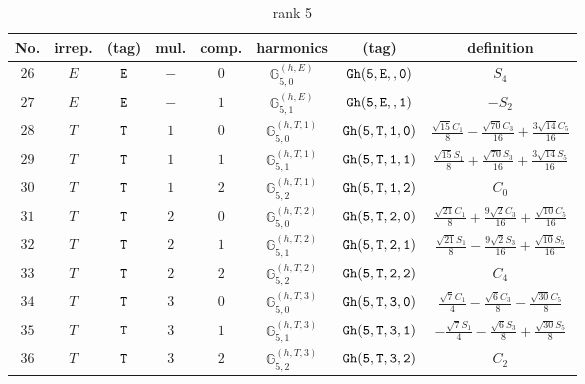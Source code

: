 \documentclass[fleqn,8pt]{jsarticle}
\begin{document}
\begin{table}[ht!]
\begin{center}
\caption{rank 5}
\renewcommand{\arraystretch}{1.3}
\begin{tabular}{cccccccc} \hline \hline
No. & irrep. & (tag) & mul. & comp. & harmonics & (tag) & definition \\ \hline
$ 26 $ & $ E $ & $ {\tt E} $ & $ - $ & $ 0 $ & $ \mathbb{G}_{5,0}^{(h,E)} $ & $ {\tt Gh(5,E,,0)} $ & $ S_{4} $ \\
$ 27 $ & $ E $ & $ {\tt E} $ & $ - $ & $ 1 $ & $ \mathbb{G}_{5,1}^{(h,E)} $ & $ {\tt Gh(5,E,,1)} $ & $ - S_{2} $ \\
$ 28 $ & $ T $ & $ {\tt T} $ & $ 1 $ & $ 0 $ & $ \mathbb{G}_{5,0}^{(h,T,1)} $ & $ {\tt Gh(5,T,1,0)} $ & $ \frac{\sqrt{15} C_{1}}{8} - \frac{\sqrt{70} C_{3}}{16} + \frac{3 \sqrt{14} C_{5}}{16} $ \\
$ 29 $ & $ T $ & $ {\tt T} $ & $ 1 $ & $ 1 $ & $ \mathbb{G}_{5,1}^{(h,T,1)} $ & $ {\tt Gh(5,T,1,1)} $ & $ \frac{\sqrt{15} S_{1}}{8} + \frac{\sqrt{70} S_{3}}{16} + \frac{3 \sqrt{14} S_{5}}{16} $ \\
$ 30 $ & $ T $ & $ {\tt T} $ & $ 1 $ & $ 2 $ & $ \mathbb{G}_{5,2}^{(h,T,1)} $ & $ {\tt Gh(5,T,1,2)} $ & $ C_{0} $ \\
$ 31 $ & $ T $ & $ {\tt T} $ & $ 2 $ & $ 0 $ & $ \mathbb{G}_{5,0}^{(h,T,2)} $ & $ {\tt Gh(5,T,2,0)} $ & $ \frac{\sqrt{21} C_{1}}{8} + \frac{9 \sqrt{2} C_{3}}{16} + \frac{\sqrt{10} C_{5}}{16} $ \\
$ 32 $ & $ T $ & $ {\tt T} $ & $ 2 $ & $ 1 $ & $ \mathbb{G}_{5,1}^{(h,T,2)} $ & $ {\tt Gh(5,T,2,1)} $ & $ \frac{\sqrt{21} S_{1}}{8} - \frac{9 \sqrt{2} S_{3}}{16} + \frac{\sqrt{10} S_{5}}{16} $ \\
$ 33 $ & $ T $ & $ {\tt T} $ & $ 2 $ & $ 2 $ & $ \mathbb{G}_{5,2}^{(h,T,2)} $ & $ {\tt Gh(5,T,2,2)} $ & $ C_{4} $ \\
$ 34 $ & $ T $ & $ {\tt T} $ & $ 3 $ & $ 0 $ & $ \mathbb{G}_{5,0}^{(h,T,3)} $ & $ {\tt Gh(5,T,3,0)} $ & $ \frac{\sqrt{7} C_{1}}{4} - \frac{\sqrt{6} C_{3}}{8} - \frac{\sqrt{30} C_{5}}{8} $ \\
$ 35 $ & $ T $ & $ {\tt T} $ & $ 3 $ & $ 1 $ & $ \mathbb{G}_{5,1}^{(h,T,3)} $ & $ {\tt Gh(5,T,3,1)} $ & $ - \frac{\sqrt{7} S_{1}}{4} - \frac{\sqrt{6} S_{3}}{8} + \frac{\sqrt{30} S_{5}}{8} $ \\
$ 36 $ & $ T $ & $ {\tt T} $ & $ 3 $ & $ 2 $ & $ \mathbb{G}_{5,2}^{(h,T,3)} $ & $ {\tt Gh(5,T,3,2)} $ & $ C_{2} $ \\
 \hline \hline
\end{tabular}
\end{center}
\end{table}
\end{document}
